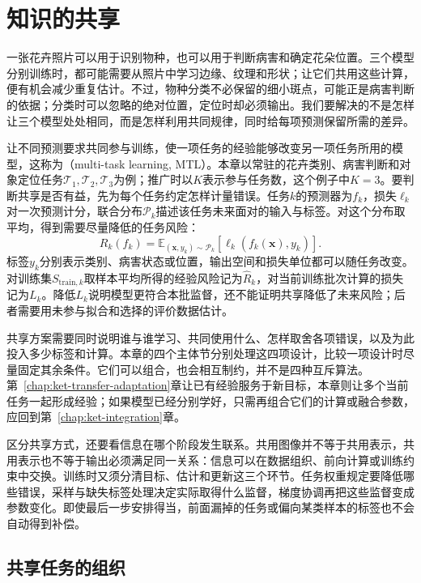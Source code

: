 \chapter{知识的共享}
\label{chap:ket-sharing}

一张花卉照片可以用于识别物种，也可以用于判断病害和确定花朵位置。三个模型分别训练时，都可能需要从照片中学习边缘、纹理和形状；让它们共用这些计算，便有机会减少重复估计。不过，物种分类不必保留的细小斑点，可能正是病害判断的依据；分类时可以忽略的绝对位置，定位时却必须输出。我们要解决的不是怎样让三个模型处处相同，而是怎样利用共同规律，同时给每项预测保留所需的差异。

让不同预测要求共同参与训练，使一项任务的经验能够改变另一项任务所用的模型，这称为（multi-task learning, MTL）。本章以常驻的花卉类别、病害判断和对象定位任务$\mathcal T_1,\mathcal T_2,\mathcal T_3$为例；推广时以$K$表示参与任务数，这个例子中$K=3$。要判断共享是否有益，先为每个任务约定怎样计量错误。任务$k$的预测器为$f_k$，损失$\ell_k$对一次预测计分，联合分布$\mathcal P_k$描述该任务未来面对的输入与标签。对这个分布取平均，得到需要尽量降低的任务风险：
\begin{equation}
  R_k(f_k)=
  \mathbb E_{(\bm{x},y_k)\sim\mathcal P_k}
  [\ell_k(f_k(\bm{x}),y_k)].
  \label{eq:ket-sharing-task-risk}
\end{equation}
标签$y_k$分别表示类别、病害状态或位置，输出空间和损失单位都可以随任务改变。对训练集$S_{\mathrm{train},k}$取样本平均所得的经验风险记为$\hat R_k$，对当前训练批次计算的损失记为$L_k$。降低$L_k$说明模型更符合本批监督，还不能证明共享降低了未来风险；后者需要用未参与拟合和选择的评价数据估计。

共享方案需要同时说明谁与谁学习、共同使用什么、怎样取舍各项错误，以及为此投入多少标签和计算。本章的四个主体节分别处理这四项设计，比较一项设计时尽量固定其余条件。它们可以组合，也会相互制约，并不是四种互斥算法。第~\ref{chap:ket-transfer-adaptation}章让已有经验服务于新目标，本章则让多个当前任务一起形成经验；如果模型已经分别学好，只需再组合它们的计算或融合参数，应回到第~\ref{chap:ket-integration}章。

区分共享方式，还要看信息在哪个阶段发生联系。共用图像并不等于共用表示，共用表示也不等于输出必须满足同一关系：信息可以在数据组织、前向计算或训练约束中交换。训练时又须分清目标、估计和更新这三个环节。任务权重规定要降低哪些错误，采样与缺失标签处理决定实际取得什么监督，梯度协调再把这些监督变成参数变化。即使最后一步安排得当，前面漏掉的任务或偏向某类样本的标签也不会自动得到补偿。

\section{共享任务的组织}
\label{sec:ket-sharing-organization}

